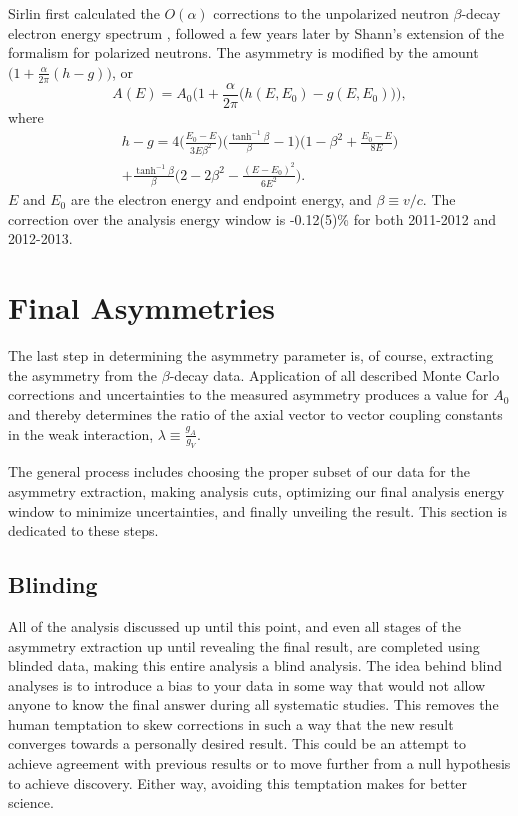 Sirlin first calculated the $O(\alpha)$ corrections to the unpolarized neutron
$\beta$-decay electron energy spectrum \cite{sirlin1967}, followed a few years
later by Shann's \cite{shann1971} extension of the formalism for polarized neutrons. The asymmetry is
modified by the amount $\big(1+\frac{\alpha}{2\pi }(h-g)\big)$, or
%
\begin{equation}
  A(E) = A_0\bigg(1+\frac{\alpha}{2\pi}\Big(h(E,E_0)-g(E,E_0)\Big)\bigg),
\end{equation}
where
\begin{multline}
  h-g = 4 \bigg( \frac{E_0-E}{3E\beta^2} \bigg)
  \bigg( \frac{\tanh^{-1}\beta}{\beta}-1 \bigg)
  \bigg(1-\beta^2+ \frac{E_0-E}{8E} \bigg) \\
  + \frac{\tanh^{-1}\beta}{\beta}
  \bigg( 2-2\beta^2-\frac{\left(E-E_0\right)^2}{6E^2} \bigg).
\end{multline}
%
\noindent $E$ and $E_0$ are the electron energy and endpoint energy, and
$\beta\equiv v/c$. The correction over the analysis energy window
is -0.12(5)\% for both 2011-2012 and 2012-2013.



\section{Final Asymmetries}

The last step in determining the asymmetry parameter is, of course, extracting the
asymmetry from the $\beta$-decay data. Application of all described Monte Carlo
corrections and uncertainties to the measured asymmetry produces a value for
$A_0$ and thereby determines the ratio of the axial vector to vector coupling
constants in the weak interaction, $\lambda \equiv \frac{g_A}{g_V}$.

The general process includes choosing the proper subset of our data for the
asymmetry extraction, making analysis cuts, optimizing our final analysis energy
window to minimize uncertainties, and finally unveiling the result. This section
is dedicated to these steps.

\subsection{Blinding}
All of the analysis discussed up until this point, and even all stages of the
asymmetry extraction up until revealing the final result,
are completed using blinded data, making this entire
analysis a blind analysis. The idea behind blind analyses
is to introduce a bias to your data in some way
that would not allow anyone to know the final answer during all systematic studies. This
removes the human temptation to skew corrections in such a way that the new result
converges towards a personally desired result. This could be an attempt to achieve agreement
with previous results or to move further from a null hypothesis to achieve discovery.
Either way, avoiding this temptation makes for better science.

